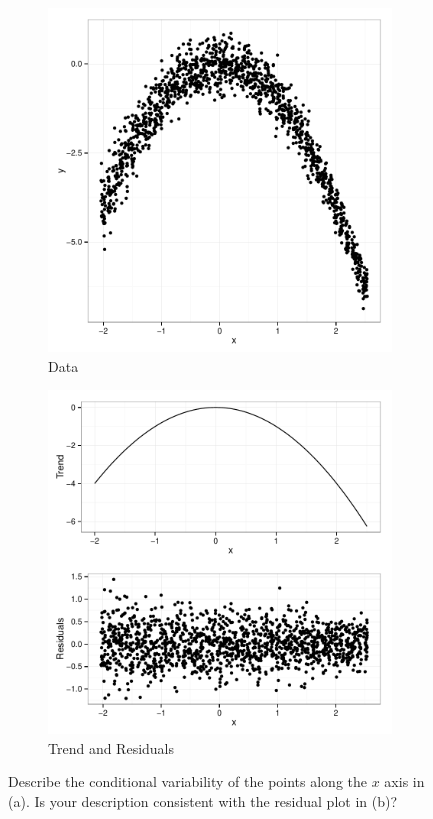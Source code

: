 \documentclass[11pt]{isuthesis}\usepackage[]{graphicx}\usepackage[]{color}
\begin{document}
\begin{figure} \hfill
\begin{subfigure}[b]{.45\textwidth}
  \centering
  \includegraphics[width=\textwidth]{fig-cleveland1}
  \caption{\small Data}
  \label{fig:clevelandsubfig1}
\end{subfigure} \hfill\hfill
\begin{subfigure}[b]{.45\textwidth}
  \centering
  \includegraphics[width=\textwidth]{fig-cleveland2}
  \caption{\small Trend and Residuals}
  \label{fig:clevelandsubfig2}
\end{subfigure} \hfill
\caption[Changing variability and nonlinear trend lines]{Describe the conditional variability of the points along the $x$ axis in (a). Is your description consistent with the residual plot in (b)?}
\label{fig:cleveland-figure}
\end{figure}
\end{document}

